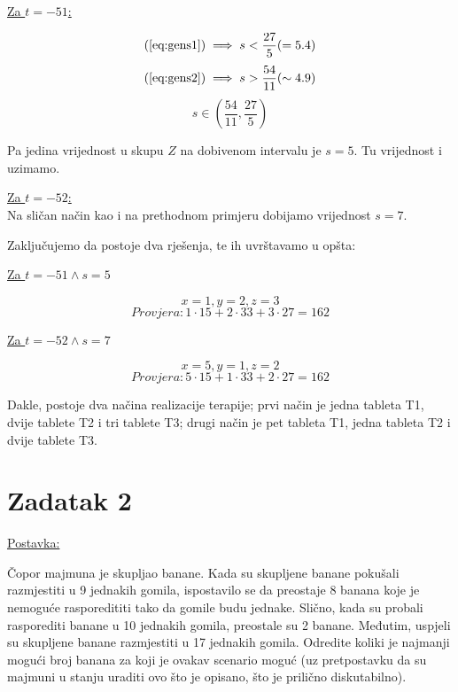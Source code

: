 \documentclass[12pt]{article}
\begin{document}
\underline{Za $t = - 51$:}

$$(\ref{eq:gens1}) \implies s < \frac{27}{5} ( = 5.4)$$
$$(\ref{eq:gens2}) \implies s > \frac{54}{11} ( \sim 4.9)$$
$$s \in (\frac{54}{11}, \frac{27}{5})$$\vspace{1mm}

Pa jedina vrijednost u skupu $Z$ na dobivenom intervalu je $s = 5$. Tu vrijednost i uzimamo.\vspace{1mm}

\underline{Za $t = - 52$:}\\

Na sličan način kao i na prethodnom primjeru dobijamo vrijednost $s = 7$.\vspace{1mm}

Zaključujemo da postoje dva rješenja, te ih uvrštavamo u opšta:\vspace{1mm}

\underline{Za $t = - 51 \land s = 5$}\vspace{1mm}

$$x = 1, y = 2, z = 3$$
$$Provjera: 1 \cdot 15 + 2 \cdot 33 + 3 \cdot 27 = 162$$\vspace{1mm}

\underline{Za $t = - 52 \land s = 7$}

$$x = 5, y = 1, z = 2$$
$$Provjera: 5 \cdot 15 + 1 \cdot 33 + 2 \cdot 27 = 162$$\vspace{1mm}

Dakle, postoje dva načina realizacije terapije; prvi način je jedna tableta T1, dvije tablete T2 i tri tablete T3; drugi način je pet tableta T1, jedna tableta T2 i dvije tablete T3.

\newpage

\section*{Zadatak 2\label{Z2}}

\underline{Postavka:}

Čopor majmuna je skupljao banane. Kada su skupljene banane pokušali razmjestiti u 9 jednakih gomila, ispostavilo se da preostaje 8 banana koje je nemoguće rasporedititi tako da gomile budu jednake. Slično, kada su probali rasporediti banane u 10 jednakih gomila, preostale su 2 banane. Međutim, uspjeli su skupljene banane razmjestiti u 17 jednakih gomila. Odredite koliki je najmanji mogući broj banana za koji je ovakav scenario moguć (uz pretpostavku da su majmuni u stanju uraditi ovo što je opisano, što je prilično diskutabilno).
\end{document}

